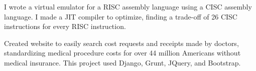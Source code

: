 \documentclass[]{deedy-resume-openfont}
\begin{document}
\begin{minipage}[t]{0.66\textwidth}

\begin{tightemize}
\item I wrote a virtual emulator for a RISC assembly language using a CISC assembly language. I made a JIT compiler to optimize, finding a trade-off of 26 CISC instructions for every RISC instruction.
\end{tightemize}

\begin{tightemize}
\item Created website to easily search cost requests and receipts made by doctors, standardizing medical procedure costs for over 44 million Americans without medical insurance. This project used Django, Grunt, JQuery, and Bootstrap.
\end{tightemize}
\sectionsep

\end{minipage} 
\end{document}
